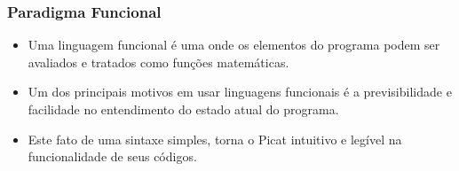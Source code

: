 
\begin{frame}[fragile]
	\frametitle{Paradigma Funcional}
    
    \begin{itemize}
    
    
    	\item Uma linguagem funcional é uma onde os elementos do programa podem ser avaliados e 
        tratados como funções matemáticas.
        
        \pause
         \item Um dos principais motivos em usar linguagens funcionais é a previsibilidade
         e facilidade no entendimento do estado atual do programa.
         
         \pause
         \item Este fato de uma  sintaxe simples, torna o Picat  intuitivo e legível na
         funcionalidade de seus códigos.
         
    \end{itemize}
    
    
\end{frame}


